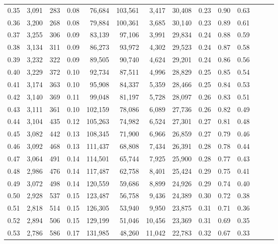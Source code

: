 \begin{tabular}{rrrrrrrrrrrrrr}
0.35 &  3,091 &  283 &  0.08 &   76,684 &  103,561 &   3,417 &  30,408 &  0.23 &  0.90 &      0.63 \\
0.36 &  3,200 &  268 &  0.08 &   79,884 &  100,361 &   3,685 &  30,140 &  0.23 &  0.89 &      0.61 \\
0.37 &  3,255 &  306 &  0.09 &   83,139 &   97,106 &   3,991 &  29,834 &  0.24 &  0.88 &      0.59 \\
0.38 &  3,134 &  311 &  0.09 &   86,273 &   93,972 &   4,302 &  29,523 &  0.24 &  0.87 &      0.58 \\
0.39 &  3,232 &  322 &  0.09 &   89,505 &   90,740 &   4,624 &  29,201 &  0.24 &  0.86 &      0.56 \\
0.40 &  3,229 &  372 &  0.10 &   92,734 &   87,511 &   4,996 &  28,829 &  0.25 &  0.85 &      0.54 \\
0.41 &  3,174 &  363 &  0.10 &   95,908 &   84,337 &   5,359 &  28,466 &  0.25 &  0.84 &      0.53 \\
0.42 &  3,140 &  369 &  0.11 &   99,048 &   81,197 &   5,728 &  28,097 &  0.26 &  0.83 &      0.51 \\
0.43 &  3,111 &  361 &  0.10 &  102,159 &   78,086 &   6,089 &  27,736 &  0.26 &  0.82 &      0.49 \\
0.44 &  3,104 &  435 &  0.12 &  105,263 &   74,982 &   6,524 &  27,301 &  0.27 &  0.81 &      0.48 \\
0.45 &  3,082 &  442 &  0.13 &  108,345 &   71,900 &   6,966 &  26,859 &  0.27 &  0.79 &      0.46 \\
0.46 &  3,092 &  468 &  0.13 &  111,437 &   68,808 &   7,434 &  26,391 &  0.28 &  0.78 &      0.44 \\
0.47 &  3,064 &  491 &  0.14 &  114,501 &   65,744 &   7,925 &  25,900 &  0.28 &  0.77 &      0.43 \\
0.48 &  2,986 &  476 &  0.14 &  117,487 &   62,758 &   8,401 &  25,424 &  0.29 &  0.75 &      0.41 \\
0.49 &  3,072 &  498 &  0.14 &  120,559 &   59,686 &   8,899 &  24,926 &  0.29 &  0.74 &      0.40 \\
0.50 &  2,928 &  537 &  0.15 &  123,487 &   56,758 &   9,436 &  24,389 &  0.30 &  0.72 &      0.38 \\
0.51 &  2,818 &  514 &  0.15 &  126,305 &   53,940 &   9,950 &  23,875 &  0.31 &  0.71 &      0.36 \\
0.52 &  2,894 &  506 &  0.15 &  129,199 &   51,046 &  10,456 &  23,369 &  0.31 &  0.69 &      0.35 \\
0.53 &  2,786 &  586 &  0.17 &  131,985 &   48,260 &  11,042 &  22,783 &  0.32 &  0.67 &      0.33 \\

\end{tabular}
